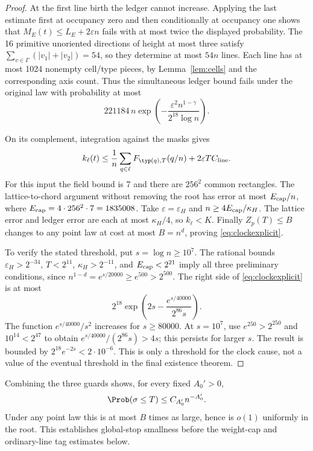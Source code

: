 \begin{proof}
At the first line birth the ledger cannot increase. Applying the
last estimate first at occupancy zero and then conditionally at
occupancy one shows that
\(M_E(t)\le L_E+2\varepsilon n\) fails with at most twice the
displayed probability. The 16 primitive unoriented directions of
height at most three satisfy
\(\sum_{v\in\Gamma}(|v_1|+|v_2|)=54\), so they determine at
most \(54n\) lines. Each line has at most 1024 nonempty cell/type
pieces, by Lemma~\ref{lem:cells} and the corresponding axis count.
Thus the simultaneous ledger bound fails under the original law
with probability at most
\[
 221184\,n\exp\left(-\frac{\varepsilon^2n^{1-\gamma}}
                                  {2^{18}\log n}\right).
\]

On its complement, integration against the masks gives
\[
 k_\ell(t)\le\frac1n\sum_{q\in\ell}F_{\typ(q),T}(q/n)
                   +2\varepsilon TC_{\rm line}.
\]
For this input the field bound is 7 and there are \(256^2\)
common rectangles. The lattice-to-chord argument without removing
the root has error at most
\(E_{\rm cap}/n\), where \(E_{\rm cap}=4\cdot256^2\cdot7=1835008\).
Take \(\varepsilon=\varepsilon_H\) and
\(n\ge4E_{\rm cap}/\kappa_H\). The lattice error and ledger
error are each at most \(\kappa_H/4\), so \(k_\ell<K\).
Finally \(Z_p(T)\le B\) changes to any point law at cost at most
\(B=n^d\), proving \eqref{eq:clockexplicit}.

To verify the stated threshold, put \(s=\log n\ge10^7\).
The rational bounds \(\varepsilon_H>2^{-34}\), \(T<2^{11}\),
\(\kappa_H>2^{-11}\), and \(E_{\rm cap}<2^{21}\) imply all
three preliminary conditions, since \(n^{1-d}=e^{s/20000}\ge
e^{500}>2^{500}\). The right side of \eqref{eq:clockexplicit}
is at most
\[
 2^{18}\exp\left(2s-\frac{e^{s/40000}}{2^{86}s}\right).
\]
The function \(e^{s/40000}/s^2\) increases for \(s\ge80000\).
At \(s=10^7\), use \(e^{250}>2^{250}\) and
\(10^{14}<2^{47}\) to obtain
\(e^{s/40000}/(2^{86}s)>4s\); this persists for larger \(s\).
The result is bounded by \(2^{18}e^{-2s}<2\cdot10^{-6}\).
This is only a threshold for the clock cause, not a value of the
eventual threshold in the final existence theorem.
\end{proof}

Combining the three guards shows, for every fixed \(A_0'>0\),
\begin{equation}\label{eq:globaltail}
 \Prob(\sigma\le T)\le C_{A_0'}n^{-A_0'}.
\end{equation}
Under any point law this is at most \(B\) times as large, hence is
\(o(1)\) uniformly in the root. This establishes global-stop smallness
before the weight-cap and ordinary-line tag estimates below.

